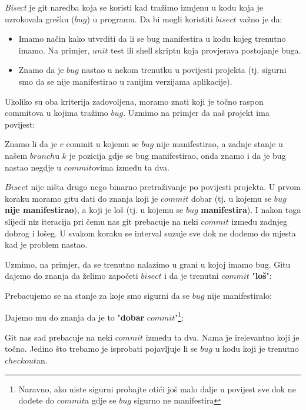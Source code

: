 
\emph{Bisect} je git naredba koja se koristi kad tražimo izmjenu u kodu koja je uzrokovala grešku ($bug$) u programu.
Da bi mogli koristiti $bisect$ važno je da:

\begin{itemize}
    \item Imamo način kako utvrditi da li se bug manifestira u kodu kojeg trenutno imamo. Na primjer, $unit$ test ili shell skriptu koja provjerava postojanje buga.
    \item Znamo da je $bug$ nastao u nekom trenutku u povijesti projekta (tj. sigurni smo da se nije manifestirao u ranijim verzijama aplikacije).
\end{itemize}

Ukoliko su oba kriterija zadovoljena, moramo znati koji je točno raspon commitova u kojima tražimo $bug$.
Uzmimo na primjer da naš projekt ima povijest:



Znamo li da je $c$ commit u kojemu se $bug$ nije manifestirao, a zadnje stanje u našem $branch$u $k$ je pozicija gdje se bug manifestirao, onda znamo i da je bug nastao negdje u $commit$ovima između ta dva.

$Bisect$ nije ništa drugo nego binarno pretraživanje po povijesti projekta. 
U prvom koraku moramo gitu dati do znanja koji je $commit$ dobar (tj. u kojemu se $bug$ \textbf{nije manifestirao}), a koji je loš (tj. u kojemu se $bug$ \textbf{manifestira}).
I nakon toga slijedi niz iteracija pri čemu nas git prebacuje na neki $commit$ između zadnjeg dobrog i lošeg.
U svakom koraku se interval suzuje sve dok ne dođemo do mjesta kad je problem nastao.

Uzmimo, na primjer, da se trenutno nalazimo u grani u kojoj imamo bug.
Gitu dajemo do znanja da želimo započeti $bisect$ i da je trenutni $commit$ "\textbf{loš}":



Prebacujemo se na stanje za koje smo sigurni da se $bug$ nije manifestiralo:



Dajemo mu do znanja da je to "\textbf{dobar} $commit$"\footnote{Naravno, ako niste sigurni probajte otići još malo dalje u povijest sve dok ne dođete do $commit$a gdje se $bug$ sigurno ne manifestira}:



Git nas sad prebacuje na neki $commit$ između ta dva.
Nama je irelevantno koji je točno.
Jedino što trebamo je isprobati pojavljuje li se $bug$ u kodu koji je trenutno $checkout$an.

